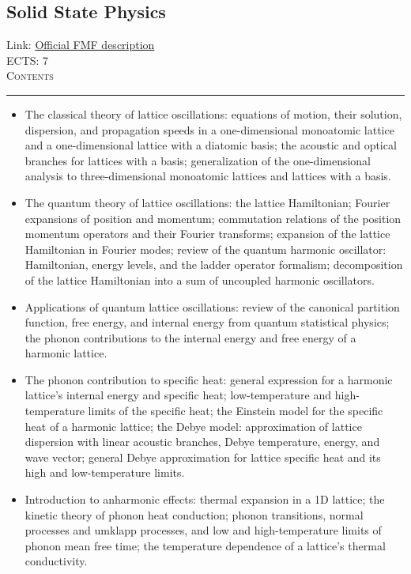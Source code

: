 \documentclass[11pt, a4paper]{article}
\newenvironment{course}[3]{
\subsection{#1}%
Link: \href{#2}{Official FMF description}\\%
ECTS: #3%
\vspace{1ex}
\\
{\large \textsc{Contents}}\\[-0.9ex]%
\rule{\textwidth}{0.5pt}
\vspace{-3ex}
}
{}
\newenvironment{chapter}[1]{
\begin{tcolorbox}[title=#1, breakable]
}
{\end{tcolorbox}}
\begin{document}
\begin{course}{Solid State Physics}{https://www.fmf.uni-lj.si/en/study-physics/programmes/1fiz/2020/7000777/courses/1138/}{7}
    \begin{chapter}{Lattice oscillations}
        \begin{itemize}
        
            \item The classical theory of lattice oscillations: equations of motion, their solution, dispersion, and propagation speeds in a one-dimensional monoatomic lattice and a one-dimensional lattice with a diatomic basis; the acoustic and optical branches for lattices with a basis; generalization of the one-dimensional analysis to three-dimensional monoatomic lattices and lattices with a basis.

            \item The quantum theory of lattice oscillations: the lattice Hamiltonian; Fourier expansions of position and momentum; commutation relations of the position momentum operators and their Fourier transforms; expansion of the lattice Hamiltonian in Fourier modes; review of the quantum harmonic oscillator: Hamiltonian, energy levels, and the ladder operator formalism; decomposition of the lattice Hamiltonian into a sum of uncoupled harmonic oscillators.

            \item Applications of quantum lattice oscillations: review of the canonical partition function, free energy, and internal energy from quantum statistical physics; the phonon contributions to the internal energy and free energy of a harmonic lattice.

            \item The phonon contribution to specific heat: general expression for a harmonic lattice's internal energy and specific heat; low-temperature and high-temperature limits of the specific heat; the Einstein model for the specific heat of a harmonic lattice; the Debye model: approximation of lattice dispersion with linear acoustic branches, Debye temperature, energy, and wave vector; general Debye approximation for lattice specific heat and its high and low-temperature limits.

            \item Introduction to anharmonic effects: thermal expansion in a 1D lattice; the kinetic theory of phonon heat conduction; phonon transitions, normal processes and umklapp processes, and low and high-temperature limits of phonon mean free time; the temperature dependence of a lattice's thermal conductivity.
        
        \end{itemize}
    \end{chapter}
\end{course}
\end{document}
